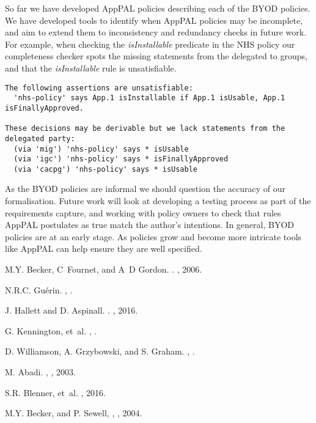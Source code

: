 \documentclass{easychair}
\begin{document}
So far we have developed AppPAL policies describing each of the BYOD policies.
We have developed tools to identify when AppPAL policies may be incomplete, and aim to extend them to inconsistency and redundancy checks in future work.
For example, when checking the \emph{isInstallable} predicate in the NHS policy our completeness checker spots the missing statements from the delegated to groups, and that the \emph{isInstallable} rule is unsatisfiable.
\begin{lstlisting}
The following assertions are unsatisfiable:
  'nhs-policy' says App.1 isInstallable if App.1 isUsable, App.1 isFinallyApproved.

These decisions may be derivable but we lack statements from the delegated party:
  (via 'mig') 'nhs-policy' says * isUsable
  (via 'igc') 'nhs-policy' says * isFinallyApproved
  (via 'cacpg') 'nhs-policy' says * isUsable
\end{lstlisting}
As the BYOD policies are informal we should question the accuracy of our formalisation.
Future work will look at developing a testing process as part of the requirements capture, and working with policy owners to check that rules AppPAL postulates as true match the author's intentions.
In general, BYOD policies are at an early stage.
As policies grow and become more intricate tools like AppPAL can help ensure they are well specified.


\begin{thebibliography}{1}
M.Y. Becker, C~Fournet, and A~D Gordon.
.
, 2006.

N.R.C. Gu{\'e}rin.
,
.%

J. Hallett and D. Aspinall.
.
, 2016.

G. Kennington, et~al.
,
.%

D. Williamson, A. Grzybowski, and S. Graham.
,
.%

M. Abadi.
,
, 2003.

S.R. Blenner, et~al.
, 2016.

M.Y. Becker, and P. Sewell,
,
, 2004.
\end{thebibliography}
\end{document}
